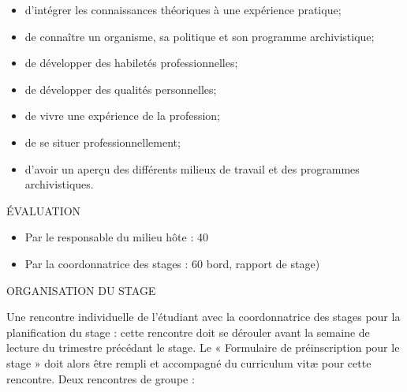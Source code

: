 \documentclass [12 pt]{article}
\begin{document}
        \begin{itemize}
        
                
        \item d'intégrer les connaissances théoriques à une expérience pratique;
                
        \item de connaître un organisme, sa politique et son programme archivistique;
                
        \item de développer des habiletés professionnelles;
                
        \item de développer des qualités personnelles;
                
        \item de vivre une expérience de la profession;
                
        \item de se situer professionnellement;
                
        \item d'avoir un aperçu des différents milieux de travail et des programmes
                    archivistiques.
            
        \end{itemize}
    
            
                ÉVALUATION
            
            
        \begin{itemize}
        
                
        \item Par le responsable du milieu hôte : 40 %
                
        \item Par la coordonnatrice des stages : 60 %
                    bord, rapport de stage)
            
        \end{itemize}
    
            
                ORGANISATION DU STAGE
            
            Une rencontre individuelle de l'étudiant avec la coordonnatrice des stages pour la
                planification du stage : cette rencontre doit se dérouler avant la semaine de
                lecture du trimestre précédant le stage. Le « Formulaire de préinscription pour le
                stage » doit alors être rempli et accompagné du curriculum vitæ pour cette
                rencontre.
            Deux rencontres de groupe :
            
\end{document}

